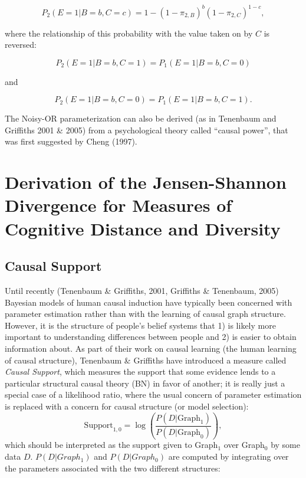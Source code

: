 \documentclass[12pt]{article}
\begin{document}
\begin{equation} \label{eq:neg-or}
P_2(E=1 | B=b, C=c) = 1- (1-\pi_{2, B})^b(1- \pi_{2, C})^{1-c},
\end{equation}

where the relationship of this probability with the value taken on by $C$ is reversed:

$$P_2(E=1 | B=b, C=1) = P_1(E=1 | B=b, C=0)$$

and

$$P_2(E=1 | B=b, C=0) = P_1(E=1 | B=b, C=1).$$

The Noisy-OR parameterization can also be derived (as in Tenenbaum and Griffiths 2001 \& 2005) from a psychological theory called ``causal power'', that was first suggested by Cheng (1997).

\section{Derivation of the Jensen-Shannon Divergence for Measures of Cognitive Distance and Diversity}
\subsection{Causal Support}
Until recently (Tenenbaum \& Griffiths, 2001, Griffiths \& Tenenbaum, 2005) Bayesian models of human causal induction have typically been concerned with parameter estimation rather than with the learning of causal graph structure. However, it is the structure of people's belief systems that 1) is likely more important to understanding differences between people and 2) is easier to obtain information about. As part of their work on causal learning (the human learning of causal structure), Tenenbaum \& Griffiths have introduced a measure called \textit{Causal Support}, which measures the support that some evidence lends to a particular structural causal theory (BN) in favor of another; it is really just a special case of a likelihood ratio, where the usual concern of parameter estimation is replaced with a concern for causal structure (or model selection):
\begin{equation} \label{eq:support}
\text{Support}_{1,0} = \log\left(\frac{P(D | \text{Graph}_1)}{P(D | \text{Graph}_0)}\right),
\end{equation}
which should be interpreted as the support given to Graph$_1$ over Graph$_0$ by some data $D$. $P(D | Graph_1)$ and $P(D | Graph_0)$ are computed by integrating over the parameters associated with the two different structures:
\end{document}
